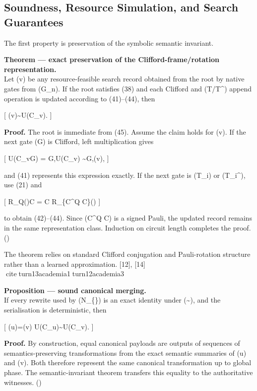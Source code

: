 \documentclass[
]{article}
\begin{document}
\hypertarget{soundness-resource-simulation-and-search-guarantees}{%
\subsection{Soundness, Resource Simulation, and Search
Guarantees}\label{soundness-resource-simulation-and-search-guarantees}}

The first property is preservation of the symbolic semantic invariant.

\textbf{Theorem --- exact preservation of the Clifford-frame/rotation
representation.}\\
Let (v) be any resource-feasible search record obtained from the root by
native gates from (\mathcal G\_n). If the root satisfies (38) and each
Clifford and (T/T\^{}\dagger) append operation is updated according to
(41)--(44), then

{[} (v)\sim U(C\_v).  {]}

\textbf{Proof.} The root is immediate from (45). Assume the claim holds
for (v). If the next gate (G) is Clifford, left multiplication gives

{[} U(C\_v\oplus G) = G,U(C\_v) \sim G,(v), {]}

and (41) represents this expression exactly. If the next gate is (T\_i)
or (T\_i\^{}\dagger), use (21) and

{[} R\_Q(\vartheta)C = C R\_\{C\^{}\dagger Q C\}(\vartheta) 
{]}

to obtain (42)--(44). Since (C\^{}\dagger Q C) is a signed Pauli, the
updated record remains in the same representation class. Induction on
circuit length completes the proof. (\square)

The theorem relies on standard Clifford conjugation and Pauli-rotation
structure rather than a learned approximation. {[}12{]}, {[}14{]}
citeturn13academia1turn12academia3

\textbf{Proposition --- sound canonical merging.}\\
If every rewrite used by (\mathcal N\_\{\}) is an exact
identity under (\sim), and the serialisation is deterministic, then

{[} \kappa(u)=\kappa(v) \Longrightarrow U(C\_u)\sim U(C\_v). 
{]}

\textbf{Proof.} By construction, equal canonical payloads are outputs of
sequences of semantics-preserving transformations from the exact
semantic summaries of (u) and (v). Both therefore represent the same
canonical transformation up to global phase. The semantic-invariant
theorem transfers this equality to the authoritative witnesses.
(\square)
\end{document}
